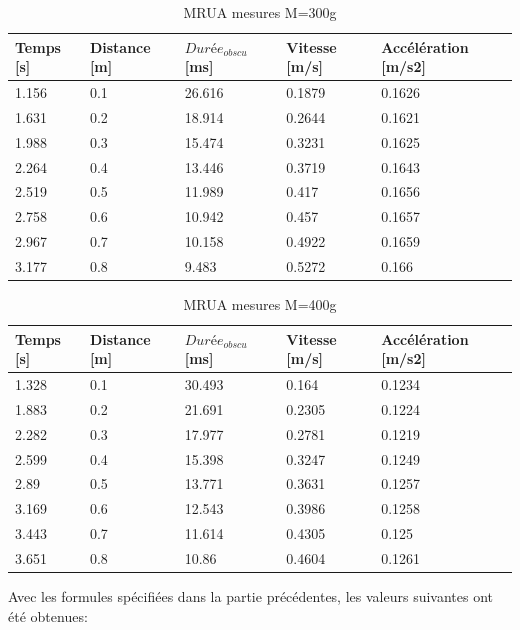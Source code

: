 \begin{table}[ht]
    \centering
    \caption[MRUA mesures M=300g]{MRUA mesures M=300g}
    \begin{tabular}{|l|l|l|l|l|}
	\hline
	Temps [s]	&Distance [m]	&$Durée_{obscu}$ [ms]	&Vitesse [m/s]	&Accélération [m/s2]\\
	\hline
	1.156	&0.1	&26.616	&0.1879	&0.1626 \\
	1.631	&0.2	&18.914	&0.2644	&0.1621 \\
	1.988	&0.3	&15.474	&0.3231	&0.1625 \\
	2.264	&0.4	&13.446	&0.3719	&0.1643 \\
	2.519	&0.5	&11.989	&0.417	&0.1656 \\
	2.758	&0.6	&10.942	&0.457	&0.1657 \\
	2.967	&0.7	&10.158	&0.4922	&0.1659 \\
	3.177	&0.8	&9.483	&0.5272	&0.166  \\
	\hline
    \end{tabular}
\end{table}

\begin{table}[ht]
    \centering
    \caption[MRUA mesures M=400g]{MRUA mesures M=400g}
    \begin{tabular}{|l|l|l|l|l|}
	\hline
	Temps [s]	&Distance [m]	&$Durée_{obscu}$ [ms]	&Vitesse [m/s]	&Accélération [m/s2]\\
	\hline
	1.328	&0.1	&30.493	&0.164	&0.1234 \\
	1.883	&0.2	&21.691	&0.2305	&0.1224 \\
	2.282	&0.3	&17.977	&0.2781	&0.1219 \\
	2.599	&0.4	&15.398	&0.3247	&0.1249 \\
	2.89	&0.5	&13.771	&0.3631	&0.1257 \\
	3.169	&0.6	&12.543	&0.3986	&0.1258 \\
	3.443	&0.7	&11.614	&0.4305	&0.125  \\
	3.651	&0.8	&10.86	&0.4604	&0.1261 \\
	\hline
    \end{tabular}
\end{table}

\newpage

Avec les formules spécifiées dans la partie précédentes, les valeurs suivantes ont été obtenues:

